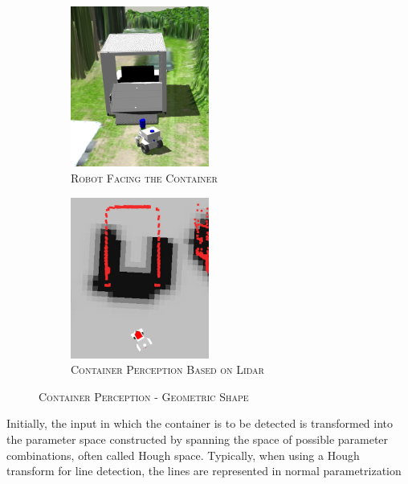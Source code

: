 \documentclass[english, master, utf8]{base/thesis_KBS}
\newcommand{\code}{\collectverb{\codebox}}
\begin{document}
\begin{figure}[H]
    \centering
    \begin{subfigure}[b]{0.49\textwidth}
        \centering
        \includegraphics[width=0.5\textwidth]{pics/container_view.png}
        \caption{\textsc{Robot Facing the Container}}
        \label{fig:container_view}
    \end{subfigure}
    \hfill
    \begin{subfigure}[b]{0.49\textwidth}
        \centering
        \includegraphics[width=0.5\textwidth]{pics/rviz_view.png}
        \caption{\textsc{Container Perception Based on Lidar}}
        \label{fig:rviz_view}
    \end{subfigure}
\caption{\textsc{Container Perception - Geometric Shape}}
\label{fig:container_geometric_shape}
\end{figure}
Initially, the input \code{LaserScan} in which the container is to be detected is transformed into the parameter space constructed by spanning the space of possible parameter
combinations, often called Hough space. Typically, when using a Hough transform for line detection, the lines are represented in normal parametrization
\end{document}
